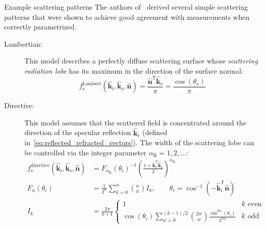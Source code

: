 \begin{highlightbox}{Example scattering patterns}
    The authors of~\cite{4052607} derived several simple scattering patterns that were shown to achieve good agreement with measurements when correctly parametrized.

\begin{description}
    \item[Lambertian:] This model describes a perfectly diffuse scattering surface whose \emph{scattering radiation lobe} has its maximum in the direction of the surface normal:
    \begin{equation}
        \label{eq:lambertian_model}
        f^\text{Lambert}_\text{s}\left(\hat{\mathbf{k}}_\text{i}, \hat{\mathbf{k}}_\text{s}, \hat{\mathbf{n}}\right) = \frac{\hat{\mathbf{n}}^\mathsf{T} \hat{\mathbf{k}}_\text{s} }{\pi} = \frac{\cos(\theta_s)}{\pi}
    \end{equation}

    \item[Directive:] This model assumes that the scattered field is concentrated around the direction of the specular reflection $\hat{\mathbf{k}}_\text{r}$ (defined in~\eqref{eq:reflected_refracted_vectors}). The width of the scattering lobe can be controlled via the integer parameter $\alpha_\text{R}=1,2,\dots$:
    \begin{equation}
        \label{eq:directive_model}
        \begin{aligned}
            f^\text{directive}_\text{s}\left(\hat{\mathbf{k}}_\text{i}, \hat{\mathbf{k}}_\text{s}, \hat{\mathbf{n}}\right) &= F_{\alpha_\text{R}}(\theta_i)^{-1} \left(\frac{ 1 + \hat{\mathbf{k}}_\text{r}^\mathsf{T} \hat{\mathbf{k}}_\text{s}}{2}\right)^{\alpha_\text{R}}\\
            F_{\alpha}(\theta_i) &= \frac{1}{2^\alpha} \sum_{k=0}^\alpha \binom{\alpha}{k} I_k,\qquad \theta_i =\cos^{-1}(-\hat{\mathbf{k}}_\text{i}^\mathsf{T}\hat{\mathbf{n}})\\
            I_k &= \frac{2\pi}{k+1} \begin{cases}
                                1 & k \text{ even} \\
                                \cos(\theta_i) \sum_{w=0}^{(k-1)/2} \binom{2w}{w} \frac{\sin^{2w}(\theta_i)}{2^{2w}}  & k \text{ odd}
                            \end{cases}
        \end{aligned}
    \end{equation}


\end{description}
\end{highlightbox}
